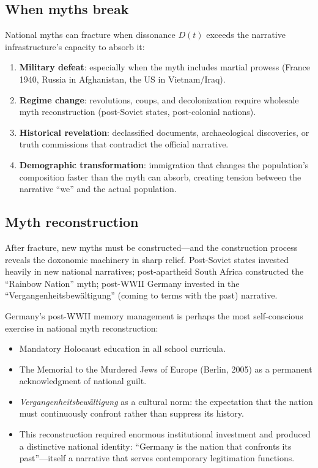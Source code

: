\subsection{When myths break}

National myths can fracture when dissonance $D(t)$ exceeds the narrative infrastructure's capacity to absorb it:

\begin{enumerate}[nosep]
  \item \textbf{Military defeat}: especially when the myth includes martial prowess (France 1940, Russia in Afghanistan, the US in Vietnam/Iraq).
  \item \textbf{Regime change}: revolutions, coups, and decolonization require wholesale myth reconstruction (post-Soviet states, post-colonial nations).
  \item \textbf{Historical revelation}: declassified documents, archaeological discoveries, or truth commissions that contradict the official narrative.
  \item \textbf{Demographic transformation}: immigration that changes the population's composition faster than the myth can absorb, creating tension between the narrative ``we'' and the actual population.
\end{enumerate}

\subsection{Myth reconstruction}

After fracture, new myths must be constructed---and the construction process reveals the doxonomic machinery in sharp relief.
Post-Soviet states invested heavily in new national narratives; post-apartheid South Africa constructed the ``Rainbow Nation'' myth; post-WWII Germany invested in the ``Vergangenheitsbew\"{a}ltigung'' (coming to terms with the past) narrative.

\begin{example}
\label{ex:german-memory}
Germany's post-WWII memory management is perhaps the most self-conscious exercise in national myth reconstruction:
\begin{itemize}[nosep]
  \item Mandatory Holocaust education in all school curricula.
  \item The Memorial to the Murdered Jews of Europe (Berlin, 2005) as a permanent acknowledgment of national guilt.
  \item \emph{Vergangenheitsbew\"{a}ltigung} as a cultural norm: the expectation that the nation must continuously confront rather than suppress its history.
  \item This reconstruction required enormous institutional investment and produced a distinctive national identity: ``Germany is the nation that confronts its past''---itself a narrative that serves contemporary legitimation functions.
\end{itemize}
\end{example}

